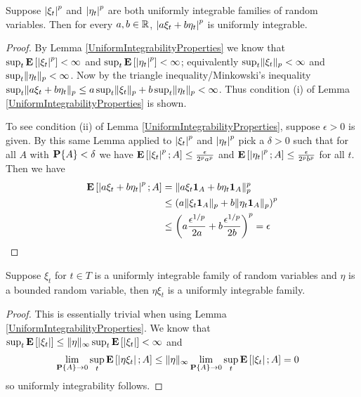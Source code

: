 \begin{lem}\label{SumsOfUniformlyIntegrable}Suppose $\left \vert \xi_t \right \vert^p$ and $\left \vert \eta_t \right \vert^p$ are both uniformly integrable
  families of random variables.  Then for every $a,b \in \mathbb{R}$,
  $\left \vert a\xi_t + b \eta_t \right \vert^p$ is uniformly integrable.
\end{lem}
\begin{proof}
By Lemma \ref{UniformIntegrabilityProperties} we know that $\sup_t
\textbf{E}\left[\left \vert \xi_t \right \vert^p\right] < \infty$ and $\sup_t
\textbf{E}\left[\left \vert \eta_t \right \vert^p\right] < \infty$; equivalently $\sup_t \lVert \xi_t \rVert_p <
\infty$ and $\sup_t \lVert \eta_t \rVert_p < \infty$.  Now by the triangle
inequality/Minkowski's inequality $\sup_t \lVert a\xi_t + b \eta_t \rVert_p
\leq a \sup_t \lVert \xi_t \rVert_p + b \sup_t \lVert \eta_t \rVert_p < \infty$.
Thus condition (i) of Lemma \ref{UniformIntegrabilityProperties} is shown.

To see condition (ii) of Lemma \ref{UniformIntegrabilityProperties},
suppose $\epsilon > 0$ is given.  By this same Lemma applied to
$\left \vert \xi_t \right \vert^p$ and $\left \vert \eta_t \right \vert^p$ pick a $\delta > 0$ such that for
all $A$ with $\textbf{P}\{A\} < \delta$ we have
$\textbf{E}\left[\left \vert \xi_t \right \vert^p ; A\right] \leq \frac{\epsilon}{2^p a^p}$ and 
$\textbf{E}\left[\left \vert \eta_t \right \vert^p ; A\right] \leq \frac{\epsilon}{2^p b^p}$ for all
$t$.  Then
we have
\begin{align*}
\textbf{E}\left[\left \vert a\xi_t + b \eta_t \right \vert^p; A\right] &= \lVert a \xi_t
  \textbf{1}_{A} + b \eta_t \textbf{1}_{A} \rVert_p^p \\
&\leq \left( a\lVert \xi_t \textbf{1}_{A} \rVert_p + b \lVert \eta_t
    \textbf{1}_{A} \rVert_p\right)^p \\
&\leq \left ( a \frac{\epsilon^{1/p}}{2a} + b
  \frac{\epsilon^{1/p}}{2b}\right )^p = \epsilon
\end{align*}
\end{proof}

\begin{lem}\label{BoundedTimesUniformlyIntegrable}Suppose $\xi_t$ for
  $t \in T$ is a uniformly integrable family of random variables and
  $\eta$ is a bounded random variable, then $\eta \xi_t$ is a
  uniformly integrable family.
\end{lem}
\begin{proof}
This is essentially trivial when using Lemma \ref{UniformIntegrabilityProperties}.  We know that $\sup_t
\textbf{E}\left[\left \vert \xi_t \right \vert\right] \leq  \lVert \eta \rVert_\infty \sup_t
\textbf{E}\left[\left \vert \xi_t \right \vert\right] < \infty$ and  
\begin{align*}
\lim_{\textbf{P}\{A\} \to 0} \sup_t \textbf{E}\left[\left \vert \eta \xi_t \right \vert; A\right]
&\leq \lVert \eta \rVert_\infty \lim_{\textbf{P}\{A\} \to 0} \sup_t
\textbf{E}\left[\left \vert  \xi_t \right \vert; A\right] = 0
\end{align*}
so uniformly integrability follows.
\end{proof}

